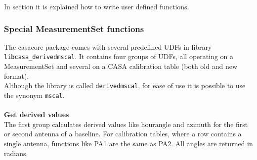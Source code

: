 In section
 it is
explained how to write user defined functions.

\subsubsection{\label{TAQL:MSFUNC}Special MeasurementSet functions}
The casacore package comes with several predefined UDFs in library
\texttt{libcasa\_derivedmscal}. It contains four groups of UDFs,
all operating on a MeasurementSet and several on a CASA calibration
table (both old and new format).  
\\Although the library is called \texttt{derivedmscal}, for ease of
use it is possible to use the synonym \texttt{mscal}. 

\paragraph*{}
{\bf Get derived values}
\\The first group calculates derived values like hourangle and azimuth
for the first or second antenna of a baseline. 
For calibration tables, where a row contains a single antenna, 
functions like PA1 are the same as PA2. 
All angles are returned in radians.
